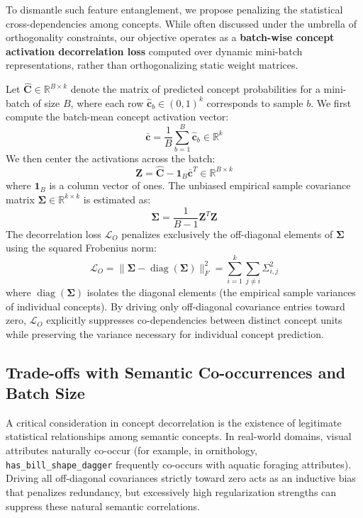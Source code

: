 \documentclass[times,twocolumn,final]{elsarticle}
\begin{document}
To dismantle such feature entanglement, we propose penalizing the statistical cross-dependencies among concepts. While often discussed under the umbrella of orthogonality constraints, our objective operates as a \textbf{batch-wise concept activation decorrelation loss} computed over dynamic mini-batch representations, rather than orthogonalizing static weight matrices.

Let $\hat{\boldsymbol{C}} \in \mathbb{R}^{B \times k}$ denote the matrix of predicted concept probabilities for a mini-batch of size $B$, where each row $\hat{\boldsymbol{c}}_b \in (0, 1)^k$ corresponds to sample $b$. We first compute the batch-mean concept activation vector:
\begin{equation}
    \bar{\boldsymbol{c}} = \frac{1}{B} \sum_{b=1}^{B} \hat{\boldsymbol{c}}_b \in \mathbb{R}^k
\end{equation}
We then center the activations across the batch:
\begin{equation}
    \boldsymbol{Z} = \hat{\boldsymbol{C}} - \mathbf{1}_B \bar{\boldsymbol{c}}^T \in \mathbb{R}^{B \times k}
\end{equation}
where $\mathbf{1}_B$ is a column vector of ones. The unbiased empirical sample covariance matrix $\boldsymbol{\Sigma} \in \mathbb{R}^{k \times k}$ is estimated as:
\begin{equation}
    \boldsymbol{\Sigma} = \frac{1}{B - 1} \boldsymbol{Z}^T \boldsymbol{Z}
\end{equation}
The decorrelation loss $\mathcal{L}_{O}$ penalizes exclusively the off-diagonal elements of $\boldsymbol{\Sigma}$ using the squared Frobenius norm:
\begin{equation}
    \mathcal{L}_{O} = \| \boldsymbol{\Sigma} - \operatorname{diag}(\boldsymbol{\Sigma}) \|_F^2 = \sum_{i=1}^{k} \sum_{j \neq i} \Sigma_{i, j}^2
\end{equation}
where $\operatorname{diag}(\boldsymbol{\Sigma})$ isolates the diagonal elements (the empirical sample variances of individual concepts). By driving only off-diagonal covariance entries toward zero, $\mathcal{L}_{O}$ explicitly suppresses co-dependencies between distinct concept units while preserving the variance necessary for individual concept prediction.

\subsection{Trade-offs with Semantic Co-occurrences and Batch Size}
A critical consideration in concept decorrelation is the existence of legitimate statistical relationships among semantic concepts. In real-world domains, visual attributes naturally co-occur (for example, in ornithology, \texttt{has\_bill\_shape\_dagger} frequently co-occurs with aquatic foraging attributes). Driving all off-diagonal covariances strictly toward zero acts as an inductive bias that penalizes redundancy, but excessively high regularization strengths can suppress these natural semantic correlations.
\end{document}
